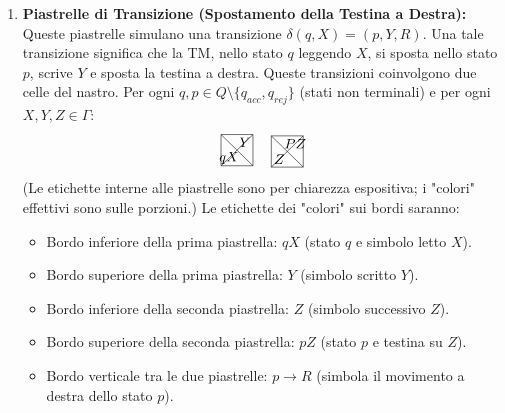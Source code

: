 \documentclass[a4paper]{article}
\theoremstyle{definition} %
\begin{document}
\begin{enumerate}
    \item \textbf{Piastrelle di Transizione (Spostamento della Testina a Destra):}
    Queste piastrelle simulano una transizione $\delta(q, X) = (p, Y, R)$. Una tale transizione significa che la TM, nello stato $q$ leggendo $X$, si sposta nello stato $p$, scrive $Y$ e sposta la testina a destra.
    Queste transizioni coinvolgono due celle del nastro.
    Per ogni $q, p \in Q \setminus \{q_{acc}, q_{rej}\}$ (stati non terminali) e per ogni $X, Y, Z \in \Gamma$:
    \[
    \begin{tikzpicture}[scale=0.8]
    \draw (0,0) -- (1,0) -- (1,1) -- (0,1) -- cycle;
    \draw (0,0) -- (1,1);
    \draw (1,0) -- (0,1);
    \node at (0.25, 0.75) {}; %
    \node at (0.75, 0.75) {$Y$}; %
    \node at (0.25, 0.25) {$qX$}; %
    \node at (0.75, 0.25) {}; %
    \end{tikzpicture}
    \quad
    \begin{tikzpicture}[scale=0.8]
    \draw (0,0) -- (1,0) -- (1,1) -- (0,1) -- cycle;
    \draw (0,0) -- (1,1);
    \draw (1,0) -- (0,1);
    \node at (0.25, 0.75) {}; %
    \node at (0.75, 0.75) {$PZ$}; %
    \node at (0.25, 0.25) {$Z$}; %
    \node at (0.75, 0.25) {}; %
    \end{tikzpicture}
    \]
    (Le etichette interne alle piastrelle sono per chiarezza espositiva; i "colori" effettivi sono sulle porzioni.)
    Le etichette dei "colori" sui bordi saranno:
    \begin{itemize}
        \item Bordo inferiore della prima piastrella: $qX$ (stato $q$ e simbolo letto $X$).
        \item Bordo superiore della prima piastrella: $Y$ (simbolo scritto $Y$).
        \item Bordo inferiore della seconda piastrella: $Z$ (simbolo successivo $Z$).
        \item Bordo superiore della seconda piastrella: $pZ$ (stato $p$ e testina su $Z$).
        \item Bordo verticale tra le due piastrelle: $p \to R$ (simbola il movimento a destra dello stato $p$).
    \end{itemize}


\end{enumerate}
\end{document}
